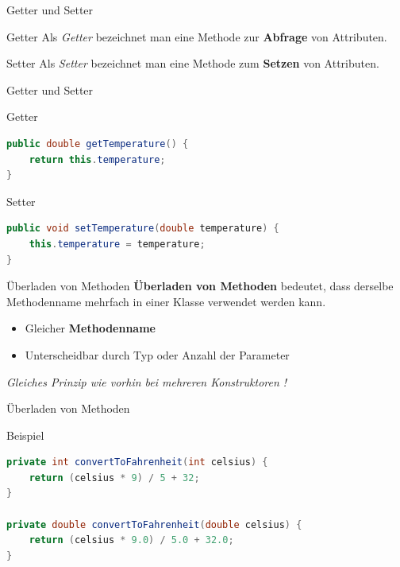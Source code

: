 \documentclass[18pt]{beamer}
\begin{document}
\begin{frame}{Getter und Setter}
    \begin{block}{Getter}
        Als \textit{Getter} bezeichnet man eine Methode zur \textbf{Abfrage} von Attributen.
    \end{block}

    \begin{block}{Setter}
        Als \textit{Setter} bezeichnet man eine Methode zum \textbf{Setzen} von Attributen.
    \end{block}

\end{frame}

\begin{frame}[fragile]{Getter und Setter}
    \begin{exampleblock}{Getter}
        \begin{lstlisting}[language=Java]
public double getTemperature() {
    return this.temperature;
}
        \end{lstlisting}


    \end{exampleblock}

    \begin{exampleblock}{Setter}
        \begin{lstlisting}[language=Java]
public void setTemperature(double temperature) {
    this.temperature = temperature;
}
        \end{lstlisting}


    \end{exampleblock}

\end{frame}


\begin{frame}{Überladen von Methoden}
    \textbf{Überladen von Methoden} bedeutet, dass derselbe Methodenname mehrfach in einer Klasse verwendet werden kann.
    \begin{itemize}
        \item Gleicher \textbf{Methodenname}
        \item Unterscheidbar durch Typ oder Anzahl der Parameter
    \end{itemize}

    \pause
    \vspace{.5in}
    \textit{Gleiches Prinzip wie vorhin bei mehreren Konstruktoren !}
\end{frame}

\begin{frame}[fragile]{Überladen von Methoden}
    \begin{exampleblock}{Beispiel}
        \begin{lstlisting}[language=Java]
private int convertToFahrenheit(int celsius) {
    return (celsius * 9) / 5 + 32;
}

private double convertToFahrenheit(double celsius) {
    return (celsius * 9.0) / 5.0 + 32.0;
}
        \end{lstlisting}
    \end{exampleblock}

\end{frame}
\end{document}
